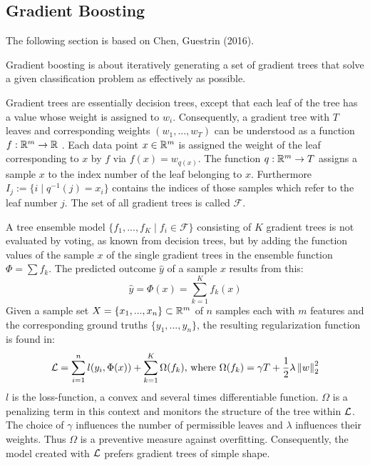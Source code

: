 \subsection{Gradient Boosting}


The following section is based on Chen, Guestrin (2016).

Gradient boosting is about iteratively generating a set of gradient trees that solve a given classification problem as effectively as possible.

Gradient trees are essentially decision trees, except that each leaf of the tree has a value whose weight is assigned to $w_i$. Consequently, a gradient tree with $T$ leaves and corresponding weights $(w_1, ... ,w_T)$ can be understood as a function $f: \mathbb{R}^m \to \mathbb{R}$ . Each data point $x \in \mathbb{R}^m$ is assigned the weight of the leaf corresponding to $x$ by $f$ via $f(x) = w_{q(x)}$. The function $q: \mathbb{R}^m \to T$ assigns a sample $x$ to the index number of the leaf belonging to $x$. Furthermore $I_j := \{ i \mid q^{-1}(j)=x_i \}$ contains the indices of those samples which refer to the leaf number $j$. The set of all gradient trees is called $\mathcal{F}$.

A tree ensemble model $\{f_1, ... ,f_K \mid f_i \in \mathcal{F}\}$ consisting of $K$ gradient trees is not evaluated by voting, as known from decision trees, but by adding the function values of the sample $x$ of the single gradient trees in the ensemble function $\Phi = \sum f_k$. The predicted outcome $\hat{y}$ of a sample $x$ results from this:
$$\hat{y} = \Phi(x) = \sum_{k=1}^{K} f_k(x)$$
Given a sample set $X= \{x_1, ..., x_n\} \subset \mathbb{R}^{m} $ of $n$ samples each with $m$ features and the corresponding ground truths $\{y_1, ... ,y_n\}$, the resulting regularization function is found in:	
$$\mathcal{L} = \sum_{i=1}^{n} l(y_i, \Phi(x)) + \sum_{k=1}^{K}\Omega(f_k) \text{,  where } \Omega(f_k) = \gamma T + \frac{1}{2}\lambda \left\| w \right\|_2^2$$
$l$ is the loss-function, a convex and several times differentiable function. $\Omega$ is a penalizing term in this context and monitors the structure of the tree within $\mathcal{L}$. The choice of $\gamma$ influences the number of permissible leaves and $\lambda$ influences their weights. Thus $\Omega$ is a preventive measure against overfitting. Consequently, the model created with $\mathcal{L}$ prefers gradient trees of simple shape.


